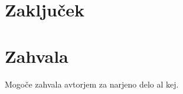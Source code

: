 \documentclass{acm_proc_article-sp}
\begin{document}
\section{Zaklju\v{c}ek}

\section{Zahvala}
Mogoče zahvala avtorjem za narjeno delo al kej.




\balancecolumns
\end{document}
